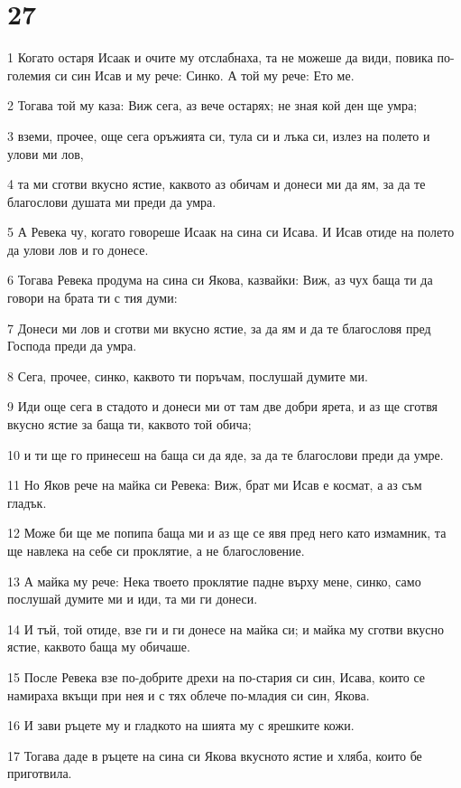 \chapter{27}

\par 1 Когато остаря Исаак и очите му отслабнаха, та не можеше да види, повика по-големия си син Исав и му рече: Синко. А той му рече: Ето ме.
\par 2 Тогава той му каза: Виж сега, аз вече остарях; не зная кой ден ще умра;
\par 3 вземи, прочее, още сега оръжията си, тула си и лъка си, излез на полето и улови ми лов,
\par 4 та ми сготви вкусно ястие, каквото аз обичам и донеси ми да ям, за да те благослови душата ми преди да умра.
\par 5 А Ревека чу, когато говореше Исаак на сина си Исава. И Исав отиде на полето да улови лов и го донесе.
\par 6 Тогава Ревека продума на сина си Якова, казвайки: Виж, аз чух баща ти да говори на брата ти с тия думи:
\par 7 Донеси ми лов и сготви ми вкусно ястие, за да ям и да те благословя пред Господа преди да умра.
\par 8 Сега, прочее, синко, каквото ти поръчам, послушай думите ми.
\par 9 Иди още сега в стадото и донеси ми от там две добри ярета, и аз ще сготвя вкусно ястие за баща ти, каквото той обича;
\par 10 и ти ще го принесеш на баща си да яде, за да те благослови преди да умре.
\par 11 Но Яков рече на майка си Ревека: Виж, брат ми Исав е космат, а аз съм гладък.
\par 12 Може би ще ме попипа баща ми и аз ще се явя пред него като измамник, та ще навлека на себе си проклятие, а не благословение.
\par 13 А майка му рече: Нека твоето проклятие падне върху мене, синко, само послушай думите ми и иди, та ми ги донеси.
\par 14 И тъй, той отиде, взе ги и ги донесе на майка си; и майка му сготви вкусно ястие, каквото баща му обичаше.
\par 15 После Ревека взе по-добрите дрехи на по-стария си син, Исава, които се намираха вкъщи при нея и с тях облече по-младия си син, Якова.
\par 16 И зави ръцете му и гладкото на шията му с ярешките кожи.
\par 17 Тогава даде в ръцете на сина си Якова вкусното ястие и хляба, които бе приготвила.
